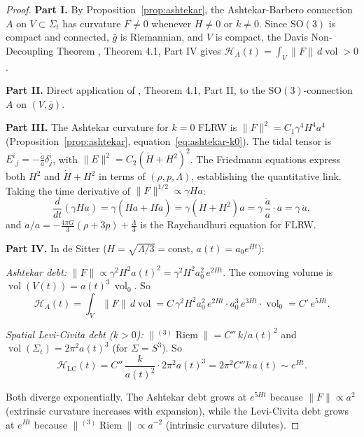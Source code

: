 \documentclass[12pt]{amsart}
\theoremstyle{definition}
\newcommand{\vol}{\operatorname{vol}}
\newcommand{\Riem}{\operatorname{Riem}}
\begin{document}
\begin{proof}
\textbf{Part I.}  By Proposition~\ref{prop:ashtekar}, the Ashtekar-Barbero connection $A$ on $V \subset \Sigma_t$ has curvature $F \neq 0$ whenever $H \neq 0$ or $k \neq 0$.  Since $\mathrm{SO}(3)$ is compact and connected, $\bar{g}$ is Riemannian, and $V$ is compact, the Davis Non-Decoupling Theorem \cite{davis2026}, Theorem 4.1, Part IV gives $\mathcal{H}_A(t) = \int_V \|F\|\,d\vol > 0$.

\textbf{Part II.}  Direct application of \cite{davis2026}, Theorem 4.1, Part II, to the $\mathrm{SO}(3)$-connection $A$ on $(V, \bar{g})$.

\textbf{Part III.}  The Ashtekar curvature for $k = 0$ FLRW is $\|F\|^2 = C_1\gamma^4 H^4 a^4$ (Proposition~\ref{prop:ashtekar}, equation~\eqref{eq:ashtekar-k0}).  The tidal tensor is $E^i{}_j = -\frac{\ddot a}{a}\delta^i_j$, with $\|E\|^2 = C_2(\dot H + H^2)^2$.  The Friedmann equations express both $H^2$ and $\dot H + H^2$ in terms of $(\rho, p, \Lambda)$, establishing the quantitative link.  Taking the time derivative of $\|F\|^{1/2} \propto \gamma H a$:
\[
\frac{d}{dt}(\gamma H a) = \gamma(\dot H a + H\dot a) = \gamma(\dot H + H^2)a = \gamma\,\frac{\ddot a}{a}\cdot a = \gamma\,\ddot a,
\]
and $\ddot a/a = -\frac{4\pi G}{3}(\rho + 3p) + \frac{\Lambda}{3}$ is the Raychaudhuri equation for FLRW.

\textbf{Part IV.}  In de Sitter ($H = \sqrt{\Lambda/3} = \text{const}$, $a(t) = a_0 e^{Ht}$):

\emph{Ashtekar debt:} $\|F\| \propto \gamma^2 H^2 a(t)^2 = \gamma^2 H^2 a_0^2\, e^{2Ht}$.  The comoving volume is $\vol(V(t)) = a(t)^3\,\vol_0$.  So
\[
\mathcal{H}_A(t) = \int_V \|F\|\,d\vol = C\,\gamma^2 H^2 a_0^2\, e^{2Ht} \cdot a_0^3\, e^{3Ht}\cdot\vol_0 = C'\, e^{5Ht}.
\]

\emph{Spatial Levi-Civita debt ($k > 0$):} $\|{}^{(3)}\Riem\| = C''\,k/a(t)^2$ and $\vol(\Sigma_t) = 2\pi^2 a(t)^3$ (for $\Sigma = S^3$).  So
\[
\mathcal{H}_{\mathrm{LC}}(t) = C''\,\frac{k}{a(t)^2}\cdot 2\pi^2 a(t)^3 = 2\pi^2 C'' k\, a(t) \sim e^{Ht}.
\]

Both diverge exponentially.  The Ashtekar debt grows at $e^{5Ht}$ because $\|F\| \propto a^2$ (extrinsic curvature increases with expansion), while the Levi-Civita debt grows at $e^{Ht}$ because $\|{}^{(3)}\Riem\| \propto a^{-2}$ (intrinsic curvature dilutes).
\end{proof}
\end{document}
